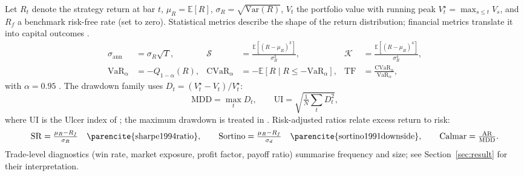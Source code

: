Let $R_t$ denote the strategy return at bar $t$, $\mu_R = \mathbb{E}[R]$, $\sigma_R = \sqrt{\mathrm{Var}(R)}$, $V_t$ the portfolio value with running peak $V_t^{\star} = \max_{s \leq t} V_s$, and $R_f$ a benchmark risk-free rate (set to zero). Statistical metrics describe the shape of the return distribution; financial metrics translate it into capital outcomes \parencite{tsay2010,cont2001empirical}.
\begin{align}
    \sigma_{\mathrm{ann}} &= \sigma_R\sqrt{T},
    & \mathcal{S} &= \tfrac{\mathbb{E}[(R-\mu_R)^{3}]}{\sigma_R^{3}},
    & \mathcal{K} &= \tfrac{\mathbb{E}[(R-\mu_R)^{4}]}{\sigma_R^{4}}, \label{eq:statmetrics}\\
    \mathrm{VaR}_\alpha &= -Q_{1-\alpha}(R),
    & \mathrm{CVaR}_\alpha &= -\mathbb{E}[R \mid R \leq -\mathrm{VaR}_\alpha],
    & \mathrm{TF} &= \tfrac{\mathrm{CVaR}_\alpha}{\mathrm{VaR}_\alpha}, \label{eq:varcvar}
\end{align}
with $\alpha = 0.95$ \parencite{artzner1999coherent}. The drawdown family uses $D_t = (V_t^{\star} - V_t)/V_t^{\star}$:
\begin{equation}\label{eq:drawdown}
    \mathrm{MDD} = \max_t D_t,
    \qquad
    \mathrm{UI} = \sqrt{\tfrac{1}{N}\textstyle\sum_t D_t^{2}},
\end{equation}
where $\mathrm{UI}$ is the Ulcer index of \textcite{martin1989ulcer}; the maximum drawdown is treated in \textcite{magdonismail2004drawdown}. Risk-adjusted ratios relate excess return to risk:
\begin{equation}\label{eq:ratios}
    \mathrm{SR} = \tfrac{\mu_R - R_f}{\sigma_R}
    \quad\text{\parencite{sharpe1994ratio}},
    \qquad
    \mathrm{Sortino} = \tfrac{\mu_R - R_f}{\sigma_d}
    \quad\text{\parencite{sortino1991downside}},
    \qquad
    \mathrm{Calmar} = \tfrac{\mathrm{AR}}{\mathrm{MDD}}.
\end{equation}
Trade-level diagnostics (win rate, market exposure, profit factor, payoff ratio) summarise frequency and size; see Section~\ref{sec:result} for their interpretation.
